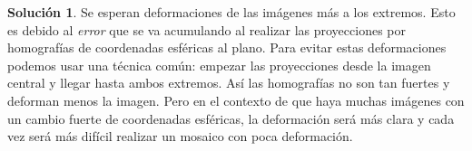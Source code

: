 \documentclass[a4paper, 11pt]{article}
\theoremstyle{definition}
\newtheorem*{solucion}{Solución}
\begin{document}
  \begin{solucion}
    Se esperan deformaciones de las imágenes más a los extremos. Esto es debido al
    \textit{error} que se va acumulando al realizar las proyecciones por homografías
    de coordenadas esféricas al plano. Para evitar estas deformaciones podemos usar
    una técnica común: empezar las proyecciones desde la imagen central y llegar
    hasta ambos extremos. Así las homografías no son tan fuertes y deforman menos la imagen.
    Pero en el contexto de que haya muchas imágenes con un cambio fuerte de coordenadas
    esféricas, la deformación será más clara y cada vez será más difícil realizar
    un mosaico con poca deformación.
  \end{solucion}
\end{document}
